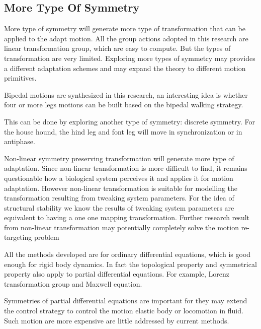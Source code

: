 \subsection{More Type Of Symmetry}
More type of symmetry will generate more type of transformation that can be applied  to the adapt motion.
All the group actions adopted in this research are linear transformation group, which are easy to compute.
But the types of transformation are very limited.
Exploring more types of symmetry may provides a different adaptation schemes and may expand the theory to different motion primitives.
\begin{itemize}

Bipedal motions are synthesized in this research, an interesting idea is whether four or more legs motions can be built based on the bipedal walking strategy.

This can be done by exploring another type of symmetry: discrete symmetry.
For the house hound, the hind leg and font leg will move in synchronization or in antiphase.




Non-linear symmetry preserving transformation will generate more type of adaptation.
Since non-linear transformation is more difficult to find, it remains questionable how a biological system perceives it and applies it for motion adaptation.
However non-linear transformation is suitable for modelling the transformation  resulting from tweaking system parameters.
For the idea of structural stability we know the results of tweaking system parameters are equivalent to having a one one mapping transformation.
Further research result from non-linear transformation may potentially completely solve the motion re-targeting problem 



All the methods developed are for  ordinary differential equations, which is good enough for rigid body dynamics.
In fact the topological property and symmetrical property also apply to partial differential equations.
For example,  Lorenz transformation group and Maxwell equation.

Symmetries of partial differential equations are important for they may extend the control strategy  to control the motion elastic body or locomotion in fluid.
Such motion are more expensive are little addressed by current \cms methods.


\end{itemize}

